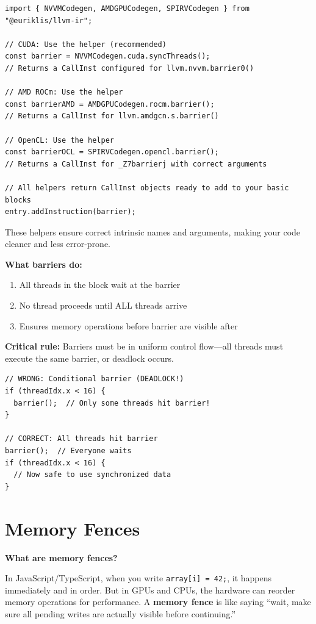 \documentclass[11pt,oneside]{book}
\begin{document}
\begin{lstlisting}[style=ts]
import { NVVMCodegen, AMDGPUCodegen, SPIRVCodegen } from "@euriklis/llvm-ir";

// CUDA: Use the helper (recommended)
const barrier = NVVMCodegen.cuda.syncThreads();
// Returns a CallInst configured for llvm.nvvm.barrier0()

// AMD ROCm: Use the helper
const barrierAMD = AMDGPUCodegen.rocm.barrier();
// Returns a CallInst for llvm.amdgcn.s.barrier()

// OpenCL: Use the helper
const barrierOCL = SPIRVCodegen.opencl.barrier();
// Returns a CallInst for _Z7barrierj with correct arguments

// All helpers return CallInst objects ready to add to your basic blocks
entry.addInstruction(barrier);
\end{lstlisting}

These helpers ensure correct intrinsic names and arguments, making your code cleaner and less error-prone.

\textbf{What barriers do:}
\begin{enumerate}[noitemsep]
  \item All threads in the block wait at the barrier
  \item No thread proceeds until ALL threads arrive
  \item Ensures memory operations before barrier are visible after
\end{enumerate}

\textbf{Critical rule:} Barriers must be in uniform control flow—all threads must execute the same barrier, or deadlock occurs.

\begin{lstlisting}[style=ts]
// WRONG: Conditional barrier (DEADLOCK!)
if (threadIdx.x < 16) {
  barrier();  // Only some threads hit barrier!
}

// CORRECT: All threads hit barrier
barrier();  // Everyone waits
if (threadIdx.x < 16) {
  // Now safe to use synchronized data
}
\end{lstlisting}

\section{Memory Fences}

\textbf{What are memory fences?}

In JavaScript/TypeScript, when you write \texttt{array[i] = 42;}, it happens immediately and in order. But in GPUs and CPUs, the hardware can reorder memory operations for performance. A \textbf{memory fence} is like saying ``wait, make sure all pending writes are actually visible before continuing.''
\end{document}

